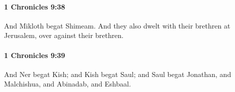 		\paragraph{1 Chronicles 9:38} %
			\label{1CHRONICLES-9-38}

			And Mikloth begat Shimeam. And they also dwelt with their brethren at Jerusalem, over against their brethren.


		\paragraph{1 Chronicles 9:39} %
			\label{1CHRONICLES-9-39}

			And Ner begat Kish; and Kish begat Saul; and Saul begat Jonathan, and Malchishua, and Abinadab, and Eshbaal.


